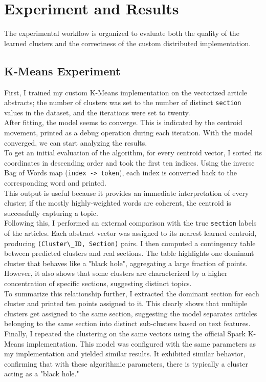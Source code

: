 \documentclass{report}
\begin{document}
\section{Experiment and Results}
The experimental workflow is organized to evaluate both the quality of the learned clusters and the correctness of the custom distributed implementation.

\subsection{K-Means Experiment}
First, I trained my custom K-Means implementation on the vectorized article abstracts; the number of clusters was set to the number of distinct \verb|section| values in the dataset, and the iterations were set to twenty.
\\
After fitting, the model seems to converge. This is indicated by the centroid movement, printed as a debug operation during each iteration. With the model converged, we can start analyzing the results.
\\
To get an initial evaluation of the algorithm, for every centroid vector, I sorted its coordinates in descending order and took the first ten indices. Using the inverse Bag of Words map (\verb|index -> token|), each index is converted back to the corresponding word and printed. 
\\
This output is useful because it provides an immediate interpretation of every cluster; if the mostly highly-weighted words are coherent, the centroid is successfully capturing a topic.
\\
Following this, I performed an external comparison with the true \verb|section| labels of the articles. Each abstract vector was assigned to its nearest learned centroid, producing \verb|(Cluster\_ID, Section)| pairs. I then computed a contingency table between predicted clusters and real sections. The table highlights one dominant cluster that behaves like a "black hole", aggregating a large fraction of points. However, it also shows that some clusters are characterized by a higher concentration of specific sections, suggesting distinct topics.
\\
To summarize this relationship further, I extracted the dominant section for each cluster and printed ten points assigned to it. This clearly shows that multiple clusters get assigned to the same section, suggesting the model separates articles belonging to the same section into distinct sub-clusters based on text features.
\\
Finally, I repeated the clustering on the same vectors using the official Spark K-Means implementation. This model was configured with the same parameters as my implementation and yielded similar results. It exhibited similar behavior, confirming that with these algorithmic parameters, there is typically a cluster acting as a "black hole."
\end{document}
